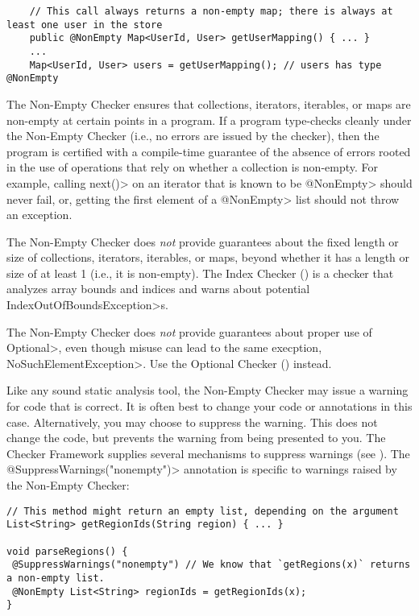 \begin{Verbatim}
    // This call always returns a non-empty map; there is always at least one user in the store
    public @NonEmpty Map<UserId, User> getUserMapping() { ... }
    ...
    Map<UserId, User> users = getUserMapping(); // users has type @NonEmpty
\end{Verbatim}


The Non-Empty Checker ensures that collections, iterators, iterables, or maps
are non-empty at certain points in a program.
If a program type-checks cleanly under the Non-Empty Checker (i.e., no errors
are issued by the checker), then the program is certified with a compile-time
guarantee of the absence of errors rooted in the use of operations that
rely on whether a collection is non-empty.
For example, calling \<next()> on an iterator that is known to be \<@NonEmpty>
should never fail, or, getting the first element of a \<@NonEmpty> list should
not throw an exception.

The Non-Empty Checker does \emph{not} provide guarantees about the fixed
length or size of collections, iterators, iterables, or maps, beyond whether
it has a length or size of at least 1 (i.e., it is non-empty).
The Index Checker () is a checker that analyzes
array bounds and indices and warns about potential
\<IndexOutOfBoundsException>s.

The Non-Empty Checker does \emph{not} provide guarantees about proper use
of \<Optional>, even though misuse can lead to the same execption,
\<NoSuchElementException>.  Use the Optional Checker
() instead.



Like any sound static analysis tool, the Non-Empty Checker may issue a warning
for code that is correct.
It is often best to change your code or annotations in this case.
Alternatively, you may choose to suppress the warning.
This does not change the code, but prevents the warning from being presented to
you.
The Checker Framework supplies several mechanisms to suppress warnings (see
).
The \<@SuppressWarnings("nonempty")> annotation is specific to warnings raised
by the Non-Empty Checker:

\begin{Verbatim}
// This method might return an empty list, depending on the argument
List<String> getRegionIds(String region) { ... }

void parseRegions() {
 @SuppressWarnings("nonempty") // We know that `getRegions(x)` returns a non-empty list.
 @NonEmpty List<String> regionIds = getRegionIds(x);
}
\end{Verbatim}

